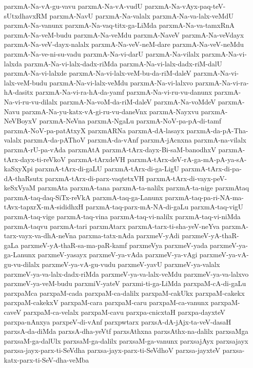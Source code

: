 {parxmA-Na-vA-gu-vavu
parxmA-Na-vA-vudU
parxmA-Na-vAyx-paq-teV-sUtxdhavxRM
parxmA-NavU
parxmA-Na-valalx
parxmA-Na-va-lalx-veMdU
parxmA-Na-vanunx
parxmA-Na-vaq-titx-ga-LiMda
parxmA-Na-va-tamxRnA
parxmA-Na-veM-budu
parxmA-Na-veMdu
parxmA-NaveV
parxmA-Na-veVdayx
parxmA-Na-veV-dayx-nalalx
parxmA-Na-veV-neM-dare
parxmA-Na-veV-neMdu
parxmA-Na-ve-ni-su-vadu
parxmA-Na-vi-darU
parxmA-Na-vilalx
parxmA-Na-vi-lalxda
parxmA-Na-vi-lalx-dadx-riMda
parxmA-Na-vi-lalx-dadx-riM-dalU
parxmA-Na-vi-lalxde
parxmA-Na-vi-lalx-veM-bu-da-riM-daleV
parxmA-Na-vi-lalx-veM-budu
parxmA-Na-vi-lalx-veMdu
parxmA-Na-vi-lalxvo
parxmA-Na-vi-ra-hA-dasitx
parxmA-Na-vi-ra-hA-da-yamf
parxmA-Na-vi-ru-vu-danunx
parxmA-Na-vi-ru-vu-dilalx
parxmA-Na-voM-da-riM-daleV
parxmA-Na-voMdeV
parxmA-Navu
parxmA-Na-yu-katx-vA-gi-ru-vu-daneVnx
parxmA-Nayxvu
parxmA-NeVBoyxV
parxmA-NeVna
parxmA-NgaLu
parxmA-NoV-pa-pA-di-tamf
parxmA-NoV-pa-patAtxyX
parxmARNa
parxmA-dA-lasayx
parxmA-da-pA-Tha-valalx
parxmA-da-pAThoV
parxmA-da-vAnf
parxmA-jAcnxna
parxmA-na-vilalx
parxmA-rU-pa-vAda
parxmAtA
parxmA-tArx-dayx-Bi-saM-banodhxV
parxmA-tArx-dayx-ti-reVkoV
parxmA-tArxdeVH
parxmA-tArx-deV-rA-ga-mA-pA-ya-sA-kaSxyXpi
parxmA-tArx-di-gaLU
parxmA-tArx-di-ga-LigU
parxmA-tArx-di-pa-dA-thaRsutx
parxmA-tArx-di-parx-vaqtetxVH
parxmA-tArx-di-vayx-peV-keSxVyaM
parxmAta
parxmA-tana
parxmA-ta-nalilx
parxmA-ta-nige
parxmAtaq
parxmA-taq-daq-SiTx-reVkA
parxmA-taq-ga-Lanunx
parxmA-taq-pa-ri-NA-ma-tAvx-tapxrX-mA-sididhxH
parxmA-taq-parx-mA-NA-di-gaLu
parxmA-taq-vigU
parxmA-taq-vige
parxmA-taq-vina
parxmA-taq-vi-nalilx
parxmA-taq-vi-niMda
parxmA-taqvu
parxmA-tari
parxmAtarx
parxmA-tarx-ti-sha-yeV-neYva
parxmA-tarx-vayx-va-dhA-neVna
parxma-tatx-nAda
parxmeV-yAdi
parxmeV-yA-thaR-gaLa
parxmeV-yA-thaR-sa-ma-paR-kamf
parxmeVya
parxmeV-yada
parxmeV-ya-ga-Lanunx
parxmeV-yasayx
parxmeV-ya-vAda
parxmeV-ya-vAgi
parxmeV-ya-vA-gu-vu-dilalx
parxmeV-ya-vA-gu-vudu
parxmeV-yavU
parxmeV-ya-valalx
parxmeV-ya-va-lalx-dadx-riMda
parxmeV-ya-va-lalx-veMdu
parxmeV-ya-va-lalxvo
parxmeV-ya-veM-budu
parxmiV-yateV
parxmi-ti-ga-LiMda
parxpaM-cA-di-gaLu
parxpaMca
parxpaM-cada
parxpaM-ca-dalilx
parxpaM-cakUkx
parxpaM-cakekx
parxpaM-cakekxV
parxpaM-cara
parxpaM-caru
parxpaM-ca-vanunx
parxpaM-caveV
parxpaM-ca-velalx
parxpaM-cavu
parxpa-cnicxtaH
parxpa-dayxteV
parxpa-nAnxya
parxpeV-di-vAnf
parxpwtarx
parxsA-dA-jAjx-ta-veV-dasaH
parxsA-da-diMda
parxsA-dha-yeVtf
parxsAthxna
parxsAthx-na-dalilx
parxsaMga
parxsaM-ga-dalUlx
parxsaM-ga-dalilx
parxsaM-ga-vanunx
parxsajAyx
parxsajayx
parxsa-jayx-parx-ti-SeVdha
parxsa-jayx-parx-ti-SeVdhoV
parxsa-jayxteV
parxsa-katx-parx-ti-SeV-dha-veMba
}

